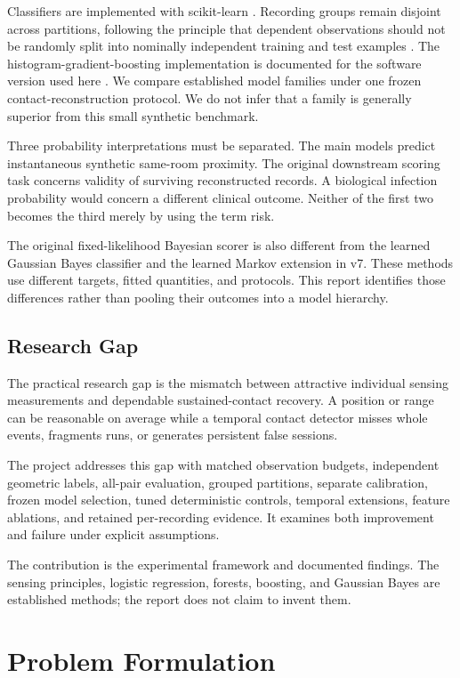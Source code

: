 \documentclass[12pt,a4paper]{report}
\begin{document}
Classifiers are implemented with scikit-learn \cite{ref9}. Recording groups remain disjoint across partitions, following the principle that dependent observations should not be randomly split into nominally independent training and test examples \cite{ref10}. The histogram-gradient-boosting implementation is documented for the software version used here \cite{ref11}. We compare established model families under one frozen contact-reconstruction protocol. We do not infer that a family is generally superior from this small synthetic benchmark.

Three probability interpretations must be separated. The main models predict instantaneous synthetic same-room proximity. The original downstream scoring task concerns validity of surviving reconstructed records. A biological infection probability would concern a different clinical outcome. Neither of the first two becomes the third merely by using the term risk.

The original fixed-likelihood Bayesian scorer is also different from the learned Gaussian Bayes classifier and the learned Markov extension in v7. These methods use different targets, fitted quantities, and protocols. This report identifies those differences rather than pooling their outcomes into a model hierarchy.

\section{Research Gap}
The practical research gap is the mismatch between attractive individual sensing measurements and dependable sustained-contact recovery. A position or range can be reasonable on average while a temporal contact detector misses whole events, fragments runs, or generates persistent false sessions.

The project addresses this gap with matched observation budgets, independent geometric labels, all-pair evaluation, grouped partitions, separate calibration, frozen model selection, tuned deterministic controls, temporal extensions, feature ablations, and retained per-recording evidence. It examines both improvement and failure under explicit assumptions.

The contribution is the experimental framework and documented findings. The sensing principles, logistic regression, forests, boosting, and Gaussian Bayes are established methods; the report does not claim to invent them.

\chapter{Problem Formulation}
\end{document}
